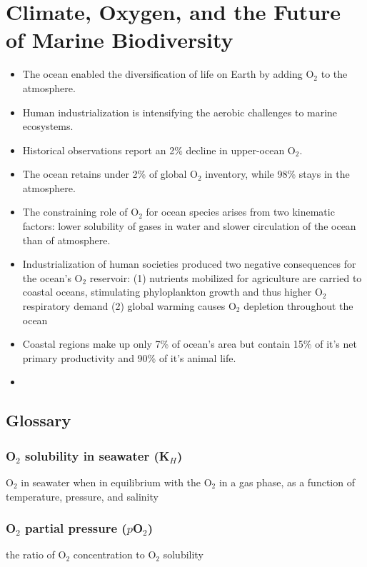 \section{Climate, Oxygen, and the Future of Marine Biodiversity}

\begin{itemize}
	\item The ocean enabled the diversification of life on Earth by adding
		O$_2$ to the atmosphere.
	\item Human industrialization is intensifying the aerobic challenges
		to marine ecosystems.
	\item Historical observations report an 2\% decline in upper-ocean
		O$_2$.
	\item The ocean retains under 2\% of global O$_2$ inventory, while
		98\% stays in the atmosphere.
	\item The constraining role of O$_2$ for ocean species arises from
		two kinematic factors: lower solubility of gases in water and
		slower circulation of the ocean than of atmosphere.
	\item Industrialization of human societies produced two negative
		consequences for the ocean's O$_2$ reservoir: (1) nutrients
		mobilized for agriculture are carried to coastal oceans,
		stimulating phyloplankton growth and thus higher O$_2$
		respiratory demand (2) global warming causes O$_2$ depletion
		throughout the ocean
	\item Coastal regions make up only 7\% of ocean's area but contain
		15\% of it's net primary productivity and 90\% of it's animal
		life.
	\item 
\end{itemize}

\subsection{Glossary}

\subsubsection{O$_2$ solubility in seawater (K$_H$)}
O$_2$ in seawater when in equilibrium with the O$_2$ in a gas phase, as a
function of temperature, pressure, and salinity

\subsubsection{O$_2$ partial pressure ($p$O$_2$)}
the ratio of O$_2$ concentration to O$_2$ solubility

